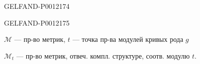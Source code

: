 \begin{GelfandAdjacentEvidence}{GELFAND-P001217}{4}

\end{GelfandAdjacentEvidence}
\begin{GelfandAdjacentEvidence}{GELFAND-P001217}{5}

\end{GelfandAdjacentEvidence}


\(\mathcal M\) --- пр-во метрик, \(t\) --- точка пр-ва модулей кривых рода \(g\)

\(\mathcal M_t\) --- пр-во метрик, отвеч. компл. структуре, соотв. модулю \(t\).


